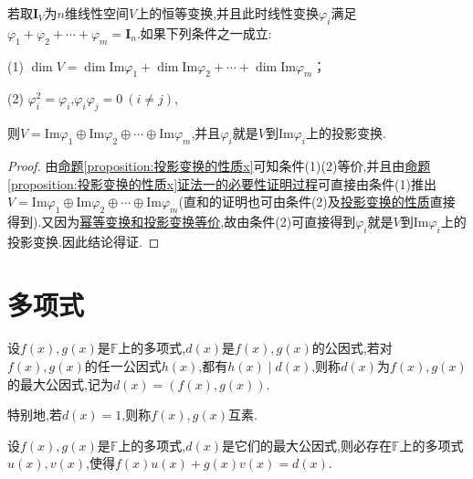 \documentclass[lang=cn,newtx,10pt,scheme=chinese]{elegantbook}
\begin{document}
\begin{corollary}\label{corollary:恒等变换的幂等分解}
若取\(\boldsymbol{I}_V\)为$n$维线性空间\(V\)上的恒等变换,并且此时线性变换\(\varphi_i\)满足\(\varphi_1+\varphi_2+\cdots+\varphi_m = \boldsymbol{I}_n\).如果下列条件之一成立:

(1) \(\dim V=\dim\text{Im}\varphi_1+\dim\text{Im}\varphi_2+\cdots+\dim\text{Im}\varphi_m\)；

(2) \(\varphi_i^2 = \varphi_i\),\(\varphi_i\varphi_j = 0\ (i\neq j)\),

则\(V = \text{Im}\varphi_1\oplus\text{Im}\varphi_2\oplus\cdots\oplus\text{Im}\varphi_m\),并且\(\varphi_i\)就是\(V\)到\(\text{Im}\varphi_i\)上的投影变换.
\end{corollary}
\begin{proof}
    由\hyperref[proposition:投影变换的性质x]{命题\ref{proposition:投影变换的性质x}}可知条件(1)(2)等价,并且由\hyperref[proposition:投影变换的性质x]{命题\ref{proposition:投影变换的性质x}证法一的必要性证明过程}可直接由条件(1)推出\(V = \text{Im}\varphi_1\oplus\text{Im}\varphi_2\oplus\cdots\oplus\text{Im}\varphi_m\)(直和的证明也可由条件(2)及\hyperref[proposition:投影变换的性质]{投影变换的性质}直接得到).又因为\hyperlink{幂等变换和投影变换等价}{幂等变换和投影变换等价},故由条件(2)可直接得到\(\varphi_i\)就是\(V\)到\(\text{Im}\varphi_i\)上的投影变换.因此结论得证.
\end{proof}






\chapter{多项式}


\begin{definition}[最大公因式和互素的定义]\label{definition:最大公因式和互素的定义}
    设\(f(x),g(x)\)是\(\mathbb{F}\)上的多项式,\(d(x)\)是\(f(x),g(x)\)的公因式,若对\(f(x),g(x)\)的任一公因式\(h(x)\),都有\(h(x)\mid d(x)\),则称\(d(x)\)为\(f(x),g(x)\)的最大公因式,记为\(d(x)=(f(x),g(x))\).

特别地,若\(d(x)=1\),则称\(f(x),g(x)\)互素.
\end{definition}

\begin{theorem}\label{theorem:最大公因式必要条件}
    设\(f(x),g(x)\)是\(\mathbb{F}\)上的多项式,\(d(x)\)是它们的最大公因式,则必存在\(\mathbb{F}\)上的多项式\(u(x),v(x)\),使得\(f(x)u(x)+g(x)v(x)=d(x)\).
\end{theorem}
\end{document}
